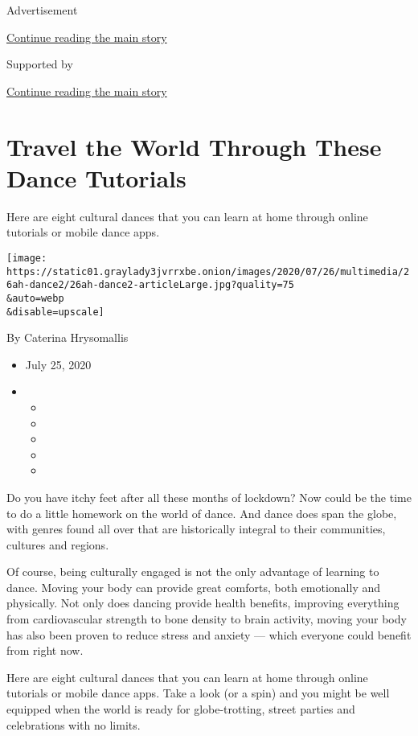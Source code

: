 Advertisement

\protect\hyperlink{after-top}{Continue reading the main story}

Supported by

\protect\hyperlink{after-sponsor}{Continue reading the main story}

\hypertarget{travel-the-world-through-these-dance-tutorials}{%
\section{Travel the World Through These Dance
Tutorials}\label{travel-the-world-through-these-dance-tutorials}}

Here are eight cultural dances that you can learn at home through online
tutorials or mobile dance apps.

\texttt{[image: https://static01.graylady3jvrrxbe.onion/images/2020/07/26/multimedia/26ah-dance2/26ah-dance2-articleLarge.jpg?quality=75\\\&auto=webp\\\&disable=upscale]}

By Caterina Hrysomallis

\begin{itemize}
\item
  July 25, 2020
\item
  \begin{itemize}
  \item
  \item
  \item
  \item
  \item
  \end{itemize}
\end{itemize}

Do you have itchy feet after all these months of lockdown? Now could be
the time to do a little homework on the world of dance. And dance does
span the globe, with genres found all over that are historically
integral to their communities, cultures and regions.

Of course, being culturally engaged is not the only advantage of
learning to dance. Moving your body can provide great comforts, both
emotionally and physically. Not only does dancing provide health
benefits, improving everything from cardiovascular strength to bone
density to brain activity, moving your body has also been proven to
reduce stress and anxiety --- which everyone could benefit from right
now.

Here are eight cultural dances that you can learn at home through online
tutorials or mobile dance apps. Take a look (or a spin) and you might be
well equipped when the world is ready for globe-trotting, street parties
and celebrations with no limits.

